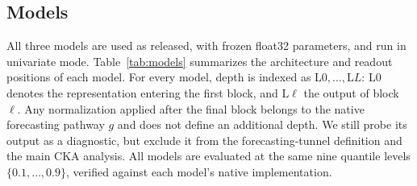 \documentclass{article} %
\begin{document}
\subsection{Models}
\label{app:models}

All three models are used as released, with frozen float32 parameters, and run in univariate mode. Table~\ref{tab:models} summarizes the architecture and readout positions of each model. For every model, depth is indexed as $\mathrm{L}0,\dots,\mathrm{L}L$: $\mathrm{L}0$ denotes the representation entering the first block, and $\mathrm{L}\ell$ the output of block $\ell$. Any normalization applied after the final block belongs to the native forecasting pathway $g$ and does not define an additional depth. We still probe its output as a diagnostic, but exclude it from the forecasting-tunnel definition and the main CKA analysis. All models are evaluated at the same nine quantile levels $\{0.1,\dots,0.9\}$, verified against each model's native implementation.
\end{document}
